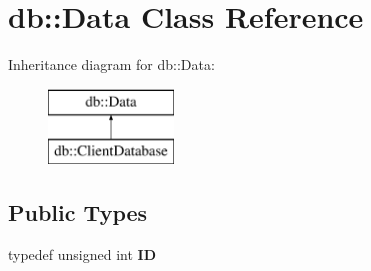 \hypertarget{classdb_1_1_data}{}\section{db\+:\+:Data Class Reference}
\label{classdb_1_1_data}
Inheritance diagram for db\+:\+:Data\+:\begin{figure}[H]
\begin{center}
\leavevmode
\includegraphics[height=2.000000cm]{classdb_1_1_data}
\end{center}
\end{figure}
\subsection*{Public Types}
\begin{DoxyCompactItemize}
\item 
\mbox{\label{classdb_1_1_data_ae56789b59e6660661b4a4158d65702bb}} 
typedef unsigned int {\bfseries ID}
\end{DoxyCompactItemize}
